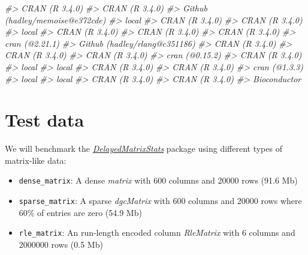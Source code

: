 \documentclass[]{book}
\newenvironment{Shaded}{\begin{snugshade}}{\end{snugshade}}
\newcommand{\CommentTok}[1]{\textcolor[rgb]{0.56,0.35,0.01}{\textit{#1}}}
\providecommand{\tightlist}{%
  \setlength{\itemsep}{0pt}\setlength{\parskip}{0pt}}
\begin{document}
\begin{Shaded}
\begin{Highlighting}[]
\CommentTok{#>  CRAN (R 3.4.0)                   }
\CommentTok{#>  CRAN (R 3.4.0)                   }
\CommentTok{#>  Github (hadley/memoise@e372cde)  }
\CommentTok{#>  local                            }
\CommentTok{#>  CRAN (R 3.4.0)                   }
\CommentTok{#>  CRAN (R 3.4.0)                   }
\CommentTok{#>  local                            }
\CommentTok{#>  CRAN (R 3.4.0)                   }
\CommentTok{#>  CRAN (R 3.4.0)                   }
\CommentTok{#>  CRAN (R 3.4.0)                   }
\CommentTok{#>  cran (@2.21.1)                   }
\CommentTok{#>  Github (hadley/rlang@c351186)    }
\CommentTok{#>  CRAN (R 3.4.0)                   }
\CommentTok{#>  CRAN (R 3.4.0)                   }
\CommentTok{#>  CRAN (R 3.4.0)                   }
\CommentTok{#>  cran (@0.15.2)                   }
\CommentTok{#>  CRAN (R 3.4.0)                   }
\CommentTok{#>  local                            }
\CommentTok{#>  local                            }
\CommentTok{#>  CRAN (R 3.4.0)                   }
\CommentTok{#>  CRAN (R 3.4.0)                   }
\CommentTok{#>  cran (@1.3.3)                    }
\CommentTok{#>  local                            }
\CommentTok{#>  local                            }
\CommentTok{#>  CRAN (R 3.4.0)                   }
\CommentTok{#>  CRAN (R 3.4.0)                   }
\CommentTok{#>  Bioconductor}
\end{Highlighting}
\end{Shaded}

\chapter{Test data}\label{test_data}

We will benchmark the
\emph{\href{https://github.com/PeteHaitch/DelayedMatrixStats}{DelayedMatrixStats}}
package using different types of matrix-like data:

\begin{itemize}
\tightlist
\item
  \texttt{dense\_matrix}: A dense \emph{matrix} with 600 columns and
  20000 rows (91.6 Mb)
\item
  \texttt{sparse\_matrix}: A sparse \emph{dgcMatrix} with 600 columns
  and 20000 rows where 60\% of entries are zero (54.9 Mb)
\item
  \texttt{rle\_matrix}: An run-length encoded column \emph{RleMatrix}
  with 6 columns and 2000000 rows (0.5 Mb)
\end{itemize}
\end{document}
